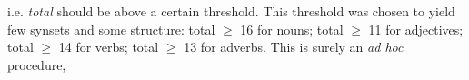 																																																																																																																																																																																																																																																																																																																																												i.e. \emph{total} should be above a certain threshold.
																																																																																																																																																																																																																																																																																																																																												This threshold was chosen to yield few synsets and some structure:
																																																																																																																																																																																																																																																																																																																																												total $\geq$ 16 for nouns;
																																																																																																																																																																																																																																																																																																																																												total $\geq$ 11 for adjectives;
																																																																																																																																																																																																																																																																																																																																												total $\geq$ 14 for verbs;
																																																																																																																																																																																																																																																																																																																																												total $\geq$ 13 for adverbs.
																																																																																																																																																																																																																																																																																																																																												This is surely an \emph{ad hoc} procedure,
